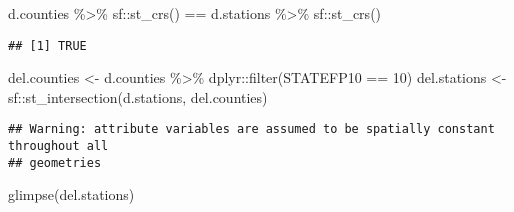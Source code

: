 \documentclass[
]{article}
\newenvironment{Shaded}{\begin{snugshade}}{\end{snugshade}}
\newcommand{\DecValTok}[1]{\textcolor[rgb]{0.00,0.00,0.81}{#1}}
\newcommand{\FunctionTok}[1]{\textcolor[rgb]{0.00,0.00,0.00}{#1}}
\newcommand{\NormalTok}[1]{#1}
\newcommand{\OtherTok}[1]{\textcolor[rgb]{0.56,0.35,0.01}{#1}}
\newcommand{\SpecialCharTok}[1]{\textcolor[rgb]{0.00,0.00,0.00}{#1}}
\begin{document}
\begin{Shaded}
\begin{Highlighting}[]
\NormalTok{d.counties }\SpecialCharTok{\%\textgreater{}\%}\NormalTok{ sf}\SpecialCharTok{::}\FunctionTok{st\_crs}\NormalTok{() }\SpecialCharTok{==}\NormalTok{ d.stations }\SpecialCharTok{\%\textgreater{}\%}\NormalTok{ sf}\SpecialCharTok{::}\FunctionTok{st\_crs}\NormalTok{()}
\end{Highlighting}
\end{Shaded}

\begin{verbatim}
## [1] TRUE
\end{verbatim}

\begin{Shaded}
\begin{Highlighting}[]
\NormalTok{del.counties }\OtherTok{\textless{}{-}}\NormalTok{ d.counties }\SpecialCharTok{\%\textgreater{}\%}\NormalTok{ dplyr}\SpecialCharTok{::}\FunctionTok{filter}\NormalTok{(STATEFP10 }\SpecialCharTok{==} \DecValTok{10}\NormalTok{)}
\NormalTok{del.stations }\OtherTok{\textless{}{-}}\NormalTok{ sf}\SpecialCharTok{::}\FunctionTok{st\_intersection}\NormalTok{(d.stations, del.counties)}
\end{Highlighting}
\end{Shaded}

\begin{verbatim}
## Warning: attribute variables are assumed to be spatially constant throughout all
## geometries
\end{verbatim}

\begin{Shaded}
\begin{Highlighting}[]
\FunctionTok{glimpse}\NormalTok{(del.stations)}
\end{Highlighting}
\end{Shaded}
\end{document}
